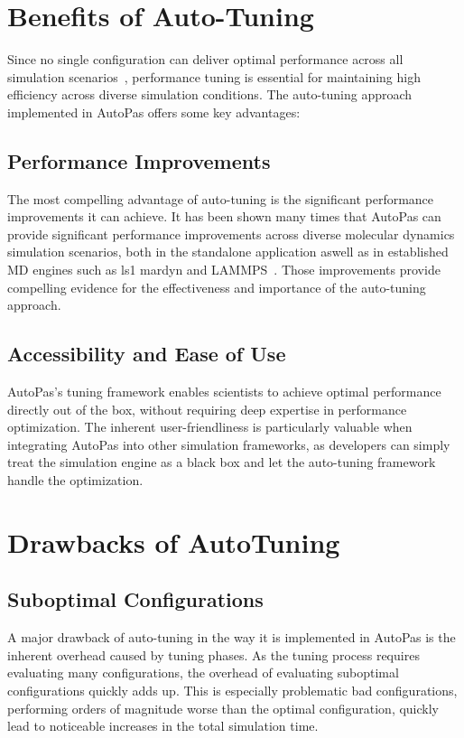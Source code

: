 \documentclass[conference]{IEEEtran}
\begin{document}
\section{Benefits of Auto-Tuning}

Since no single configuration can deliver optimal performance across all simulation scenarios~\cite{Tchipev2020}, performance tuning is essential for maintaining high efficiency across diverse simulation conditions. The auto-tuning approach implemented in AutoPas offers some key advantages:

\subsection*{Performance Improvements}

The most compelling advantage of auto-tuning is the significant performance improvements it can achieve. It has been shown many times that AutoPas can provide significant performance improvements across diverse molecular dynamics simulation scenarios, both in the standalone application aswell as in established MD engines such as ls1 mardyn and LAMMPS~\cite{SECKLER2021101296}\cite{Gratl2022AutoPas}. Those improvements provide compelling evidence for the effectiveness and importance of the auto-tuning approach.

\subsection*{Accessibility and Ease of Use}

AutoPas's tuning framework enables scientists to achieve optimal performance directly out of the box, without requiring deep expertise in performance optimization. The inherent user-friendliness is particularly valuable when integrating AutoPas into other simulation frameworks, as developers can simply treat the simulation engine as a black box and let the auto-tuning framework handle the optimization.

\section{Drawbacks of AutoTuning}

\subsection*{Suboptimal Configurations}

A major drawback of auto-tuning in the way it is implemented in AutoPas is the inherent overhead caused by tuning phases. As the tuning process requires evaluating many configurations, the overhead of evaluating suboptimal configurations quickly adds up. This is especially problematic bad configurations, performing orders of magnitude worse than the optimal configuration, quickly lead to noticeable increases in the total simulation time.
\end{document}
